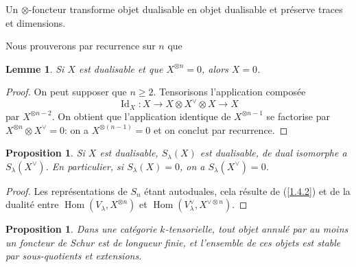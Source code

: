 \documentclass[11pt,a4paper]{article}
\theoremstyle{plain}
\newtheorem{lemma}[theorem]{Lemme}
\newtheorem{proposition}[theorem]{Proposition}
\theoremstyle{definition}
\DeclareMathOperator{\Hom}{Hom}
\DeclareMathOperator{\Id}{Id}
\begin{document}
Un $\otimes$-foncteur transforme objet dualisable en objet dualisable et pr\'eserve traces et dimensions.

Nous prouverons par recurrence sur $n$ que

\begin{lemma}\label{1.17}
Si $X$ est dualisable et que $X^{\otimes n}=0$, alors $X=0$.
\end{lemma}

\begin{proof}
On peut supposer que $n\geq2$. Tensorisons l'application compos\'ee
\[
\Id_X:X\to X\otimes X^\vee\otimes X\to X
\]
par $X^{\otimes n-2}$. On obtient que l'application identique de $X^{\otimes n-1}$ se factorise par $X^{\otimes n}\otimes X^\vee=0$: on a $X^{\otimes(n-1)}=0$ et on conclut par recurrence.
\end{proof}

\begin{proposition}\label{1.18}
Si $X$ est dualisable, $S_\lambda(X)$ est dualisable, de dual isomorphe a $S_\lambda(X^\vee)$. En particulier, si $S_\lambda(X)=0$, on a $S_\lambda(X^\vee)=0$.
\end{proposition}

\begin{proof}
Les repr\'esentations de $S_n$ \'etant autoduales, cela r\'esulte de (\ref{1.4.2}) et de la dualit\'e entre $\Hom(V_\lambda,X^{\otimes n})$ et $\Hom(V_\lambda^\vee,X^{\vee\otimes n})$.
\end{proof}

\begin{proposition}\label{1.19}
Dans une cat\'egorie $k$-tensorielle, tout objet annul\'e par au moins un foncteur de Schur est de longueur finie, et l'ensemble de ces objets est stable par sous-quotients et extensions.
\end{proposition}
\end{document}
